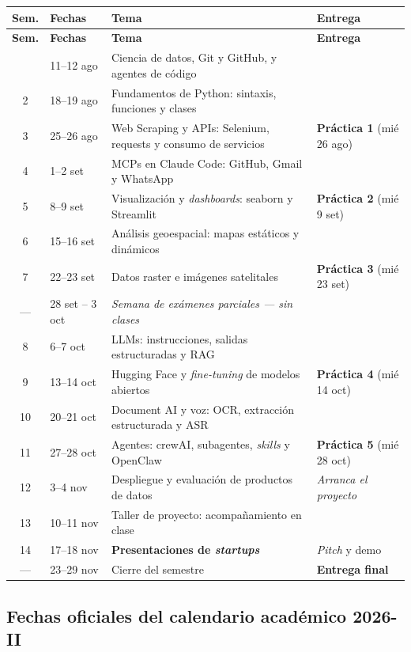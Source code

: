 \documentclass[11pt]{article}
\begin{document}
\begin{xltabular}{\textwidth}{@{}clXL{3.6cm}@{}}
\toprule
\textbf{Sem.} & \textbf{Fechas} & \textbf{Tema} & \textbf{Entrega} \\
\midrule
\endfirsthead
\toprule
\textbf{Sem.} & \textbf{Fechas} & \textbf{Tema} & \textbf{Entrega} \\
\midrule
\endhead
\bottomrule
{} & 11--12 ago & Ciencia de datos, Git y GitHub, y agentes de c\'odigo & \\
2 & 18--19 ago & Fundamentos de Python: sintaxis, funciones y clases & \\
3 & 25--26 ago & Web Scraping y APIs: Selenium, requests y consumo de servicios & \textbf{Pr\'actica 1} (mi\'e 26 ago) \\
4 & 1--2 set & MCPs en Claude Code: GitHub, Gmail y WhatsApp & \\
5 & 8--9 set & Visualizaci\'on y \emph{dashboards}: seaborn y Streamlit & \textbf{Pr\'actica 2} (mi\'e 9 set) \\
6 & 15--16 set & An\'alisis geoespacial: mapas est\'aticos y din\'amicos & \\
7 & 22--23 set & Datos raster e im\'agenes satelitales & \textbf{Pr\'actica 3} (mi\'e 23 set) \\
--- & 28 set -- 3 oct & \textit{Semana de ex\'amenes parciales --- sin clases} & \\
8 & 6--7 oct & LLMs: instrucciones, salidas estructuradas y RAG & \\
9 & 13--14 oct & Hugging Face y \emph{fine-tuning} de modelos abiertos & \textbf{Pr\'actica 4} (mi\'e 14 oct) \\
10 & 20--21 oct & Document AI y voz: OCR, extracci\'on estructurada y ASR & \\
11 & 27--28 oct & Agentes: crewAI, subagentes, \emph{skills} y OpenClaw & \textbf{Pr\'actica 5} (mi\'e 28 oct) \\
12 & 3--4 nov & Despliegue y evaluaci\'on de productos de datos & \emph{Arranca el proyecto} \\
13 & 10--11 nov & Taller de proyecto: acompa\~namiento en clase & \\
14 & 17--18 nov & \textbf{Presentaciones de \emph{startups}} & \emph{Pitch} y demo \\
--- & 23--29 nov & Cierre del semestre & \textbf{Entrega final} \\
\end{xltabular}

\subsection*{Fechas oficiales del calendario acad\'emico 2026-II}
\end{document}
